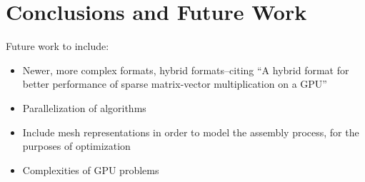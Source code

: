 \section{Conclusions and Future Work}
\label{sec:conclusion}

Future work to include:
\begin{itemize}
  \item{Newer, more complex formats, hybrid formats--citing ``A hybrid format for better performance of sparse matrix-vector multiplication on a GPU''}
  \item{Parallelization of algorithms}
  \item{Include mesh representations in order to model the assembly process, for the purposes of optimization}
  \item{Complexities of GPU problems}
\end{itemize}